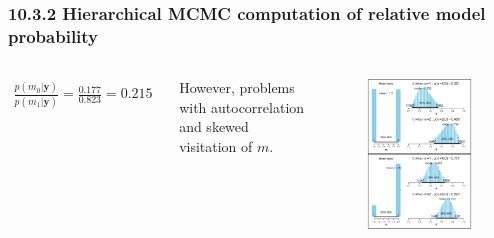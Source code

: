 \documentclass[usenames,dvipsnames,table]{beamer}
\begin{document}
\begin{frame}
\frametitle{10.3.2 Hierarchical MCMC computation of relative model probability}
\begin{columns}[c]

\begin{align*}
\frac{p(m_0|\mathbf{y})}
     {p(m_1|\mathbf{y})}
    =  \frac{0.177}
             {0.823}
    = 0.215
\end{align*}

However, problems with autocorrelation and skewed visitation of $m$.

\begin{figure}
\centering
\includegraphics[height=.8\textheight]{img/fig10_4}
\end{figure}
\end{columns}
\end{frame}
\end{document}
